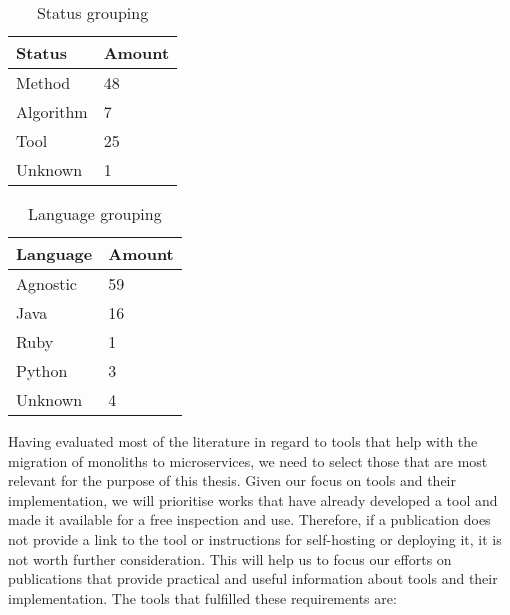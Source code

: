 \begin{table}[!htb] \caption{Status grouping} \label{tab:status-grouping}
  \begin{center}
    \begin{tabular}[c]{p{12em}|p{4em}}
      \textbf{Status} &
      \textbf{Amount} \\
      \hline Method & {48} \\
      \hline Algorithm & {7} \\
      \hline Tool & {25} \\
      \hline Unknown & {1} \\
    \end{tabular}
  \end{center}
\end{table}

\begin{table}[!htb] \caption{Language grouping} \label{tab:language-grouping}
  \begin{center}
    \begin{tabular}[c]{p{12em}|p{4em}}
      \textbf{Language} &
      \textbf{Amount} \\
      \hline Agnostic & {59} \\
      \hline Java & {16} \\
      \hline Ruby & {1} \\
      \hline Python & {3} \\
      \hline Unknown & {4} \\
    \end{tabular}
  \end{center}
\end{table}

Having evaluated most of the literature in regard to tools that help with the
migration of monoliths to microservices, we need to select those that are most
relevant for the purpose of this thesis. Given our focus on tools and their
implementation, we will prioritise works that have already developed a tool and
made it available for a free inspection and use. Therefore, if a publication
does not provide a link to the tool or instructions for self-hosting or
deploying it, it is not worth further consideration. This will help us to focus
our efforts on publications that provide practical and useful information about
tools and their implementation. The tools that fulfilled these requirements are:

